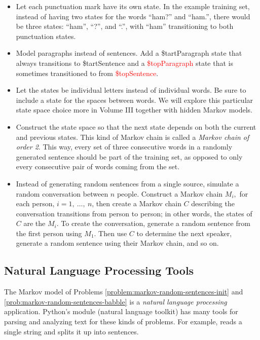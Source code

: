 \begin{itemize}
\item Let each punctuation mark have its own state.
In the example training set, instead of having two states for the words ``ham?'' and ``ham.'', there would be three states: ``ham'', ``?'', and ``.'', with ``ham'' transitioning to both punctuation states.

\item Model paragraphs instead of sentences.
Add a \textcolor[rgb]{0,.6,0}{\$tartParagraph} state that always transitions to \textcolor[rgb]{0,.6,0}{\$tartSentence} and a \textcolor{red}{\$topParagraph} state that is sometimes transitioned to from \textcolor{red}{\$topSentence}.

\item Let the states be individual letters instead of individual words.
Be sure to include a state for the spaces between words.
We will explore this particular state space choice more in Volume III together with hidden Markov models.

\item Construct the state space so that the next state depends on both the current and previous states.
This kind of Markov chain is called a \emph{Markov chain of order 2}.
This way, every set of three consecutive words in a randomly generated sentence should be part of the training set, as opposed to only every consecutive pair of words coming from the set.

\item Instead of generating random sentences from a single source, simulate a random conversation between $n$ people.
Construct a Markov chain $M_i,$ for each person, $i=1,\ \ldots,\ n$, then create a Markov chain $C$ describing the conversation transitions from person to person; in other words, the states of $C$ are the $M_i$.
To create the conversation, generate a random sentence from the first person using $M_1$.
Then use $C$ to determine the next speaker, generate a random sentence using their Markov chain, and so on.
\end{itemize}

\newpage

\subsection*{Natural Language Processing Tools} %

The Markov model of Problems \ref{problem:markov-random-sentences-init} and \ref{prob:markov-random-sentences-babble} is a \emph{natural language processing} application.
Python's  module (natural language toolkit) has many tools for parsing and analyzing text for these kinds of problems.
For example,  reads a single string and splits it up into sentences.

